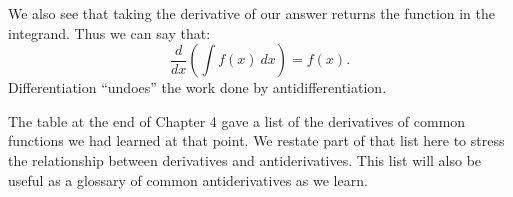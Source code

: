 We also see that taking the derivative of our answer returns the function in the integrand. Thus we can say that: $$\frac{d}{dx}\left(\int f(x)\ dx\right) = f(x).$$
Differentiation ``undoes'' the work done by antidifferentiation. 

The table at the end of Chapter 4  gave a list of the derivatives of common functions we had learned at that point. We restate part of that list here to stress the relationship between derivatives and antiderivatives. This list will also be useful as a glossary of common antiderivatives as we learn.



